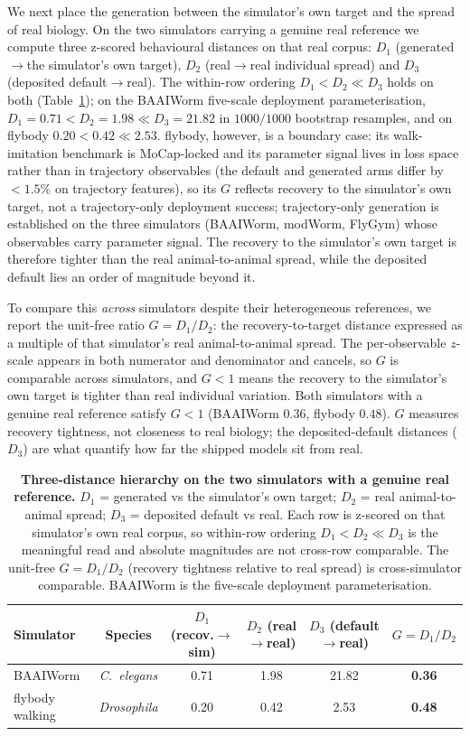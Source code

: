\documentclass[11pt]{article}
\begin{document}
We next place the generation between the simulator's own target and the spread of real biology. On the two simulators carrying a genuine real reference we compute three z-scored behavioural distances on that real corpus: $D_1$ (generated$\to$the simulator's own target), $D_2$ (real$\to$real individual spread) and $D_3$ (deposited default$\to$real). The within-row ordering $D_1{<}D_2{\ll}D_3$ holds on both (Table~\ref{tab:hierarchy}); on the BAAIWorm five-scale deployment parameterisation, $D_1{=}0.71<D_2{=}1.98\ll D_3{=}21.82$ in $1000/1000$ bootstrap resamples, and on flybody $0.20<0.42\ll2.53$. flybody, however, is a boundary case: its walk-imitation benchmark is MoCap-locked and its parameter signal lives in loss space rather than in trajectory observables (the default and generated arms differ by ${<}1.5\%$ on trajectory features), so its $G$ reflects recovery to the simulator's own target, not a trajectory-only deployment success; trajectory-only generation is established on the three simulators (BAAIWorm, modWorm, FlyGym) whose observables carry parameter signal. The recovery to the simulator's own target is therefore tighter than the real animal-to-animal spread, while the deposited default lies an order of magnitude beyond it.

To compare this \emph{across} simulators despite their heterogeneous references, we report the unit-free ratio $G{=}D_1/D_2$: the recovery-to-target distance expressed as a multiple of that simulator's real animal-to-animal spread. The per-observable $z$-scale appears in both numerator and denominator and cancels, so $G$ is comparable across simulators, and $G{<}1$ means the recovery to the simulator's own target is tighter than real individual variation. Both simulators with a genuine real reference satisfy $G{<}1$ (BAAIWorm $0.36$, flybody $0.48$). $G$ measures recovery tightness, not closeness to real biology; the deposited-default distances ($D_3$) are what quantify how far the shipped models sit from real.

\begin{table}[h]
\centering\small
\caption{\textbf{Three-distance hierarchy on the two simulators with a genuine real reference.} $D_1$ = generated vs the simulator's own target; $D_2$ = real animal-to-animal spread; $D_3$ = deposited default vs real. Each row is z-scored on that simulator's own real corpus, so within-row ordering $D_1{<}D_2{\ll}D_3$ is the meaningful read and absolute magnitudes are not cross-row comparable. The unit-free $G{=}D_1/D_2$ (recovery tightness relative to real spread) is cross-simulator comparable. BAAIWorm is the five-scale deployment parameterisation.}
\label{tab:hierarchy}
\begin{tabular}{lccccc}\toprule
Simulator & Species & $D_1$ (recov.$\to$sim) & $D_2$ (real$\to$real) & $D_3$ (default$\to$real) & $G{=}D_1/D_2$ \\\midrule
BAAIWorm & \textit{C.~elegans} & 0.71 & 1.98 & 21.82 & \textbf{0.36} \\
flybody walking & \textit{Drosophila} & 0.20 & 0.42 & 2.53 & \textbf{0.48} \\\bottomrule
\end{tabular}
\end{table}
\end{document}
